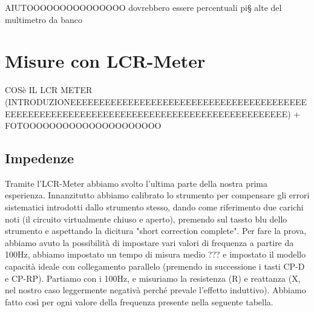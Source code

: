 AIUTOOOOOOOOOOOOOOO dovrebbero essere percentuali pi§ alte del multimetro da banco














\section{Misure con LCR-Meter}
\label{sec:lcr}

COSè IL LCR METER (INTRODUZIONEEEEEEEEEEEEEEEEEEEEEEEEEEEEEEEEEEEEEEEEEEEEEEEEEEEEEEEEEEEEEEEEEEEEEEEEEEEEEEEEEEEEEEEEEE) + FOTOOOOOOOOOOOOOOOOOOOOO


\subsection{Impedenze}
\label{sub:z}

Tramite l'LCR-Meter abbiamo svolto l'ultima parte della nostra prima esperienza.
Innanzitutto abbiamo calibrato lo strumento per compensare gli errori sistematici introdotti dallo strumento stesso, dando come riferimento due carichi noti (il circuito virtualmente chiuso e aperto), premendo sul tassto blu dello strumento e aspettando la dicitura "short correction complete".
Per fare la prova, abbiamo avuto la possibilità di impostare vari valori di frequenza a partire da 100Hz, abbiamo impostato un tempo di misura medio ??? e impostato il modello capacità ideale con collegamento parallelo (premendo in successione i tasti CP-D e CP-RP).
Partiamo con i 100Hz, e misuriamo la resistenza (R) e reattanza (X, nel nostro caso leggermente negativà perché prevale l'effetto induttivo). Abbiamo fatto così per ogni valore della frequenza presente nella seguente tabella.  


\begin{table}[ht]
\centering
{}
\caption{LCR, misura Impedenza, Tempo di misura: Long}
\label{tab:lcr_z}
\end{table}

